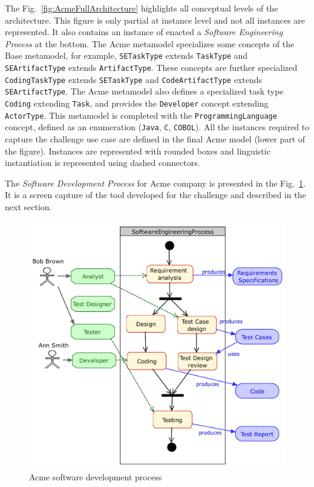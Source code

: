 The Fig.~\ref{fig:AcmeFullArchitecture} highlights all conceptual levels of the
architecture. This figure is only partial at instance level and not all
instances are represented. It also contains an instance of enacted a
\textit{Software Engineering Process} at the bottom. The Acme metamodel
specializes some concepts of the Base metamodel, for example,
\texttt{SETaskType} extends \texttt{TaskType} and \texttt{SEArtifactType}
extends \texttt{ArtifactType}. These concepts are further specialized
\texttt{CodingTaskType} extends \texttt{SETaskType} and
\texttt{CodeArtifactType} extends \texttt{SEArtifactType}.  The Acme metamodel
also defines a specialized task type \texttt{Coding} extending \texttt{Task},
and provides the \texttt{Developer} concept extending \texttt{ActorType}. This
metamodel is completed with the \texttt{ProgrammingLanguage} concept, defined
as an enumeration (\texttt{Java}, \texttt{C}, \texttt{COBOL}). All the
instances required to capture the challenge use case are defined in the final
Acme model (lower part of the figure). Instances are represented with rounded
boxes and linguistic instantiation is represented using dashed connectors.

The \textit{Software Development Process} for Acme company is presented in the
Fig.~\ref{fig:AcmeSoftwareDevelopmentProcess}. It is a screen capture of the
tool developed for the challenge and described in the next section.

\begin{figure}[t]
 \centering
    \includegraphics[width=1.0 \columnwidth]{Figures/SoftwareEngineeringProcessCroped.pdf}
     \caption{Acme software development process}
    \label{fig:AcmeSoftwareDevelopmentProcess}
\end{figure}

